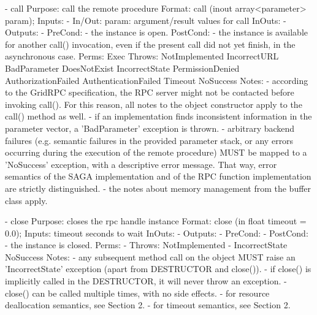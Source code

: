 \begin{myspec}
 
    - call
      Purpose:  call the remote procedure
      Format:   call         (inout array<parameter> param);
      Inputs:   - 
      In/Out:   param:        argument/result values for call
      InOuts:   -
      Outputs:  - 
      PreCond:  - the instance is open.
      PostCond: - the instance is available for another call()
                  invocation, even if the present call did not
                  yet finish, in the asynchronous case.
      Perms:    Exec
      Throws:   NotImplemented
                IncorrectURL
                BadParameter
                DoesNotExist
                IncorrectState
                PermissionDenied
                AuthorizationFailed
                AuthenticationFailed
                Timeout
                NoSuccess
      Notes:    - according to the GridRPC specification, the 
                  RPC server might not be contacted before
                  invoking call(). For this reason, all notes to
                  the object constructor apply to the call()
                  method as well.
                - if an implementation finds inconsistent
                  information in the parameter vector, a 
                  'BadParameter' exception is thrown.
                - arbitrary backend failures (e.g. semantic
                  failures in the provided parameter stack, or
                  any errors occurring during the execution of
                  the remote procedure) MUST be mapped to a
                  'NoSuccess' exception, with a descriptive
                  error message.  That way, error semantics of
                  the SAGA implementation and of the RPC
                  function implementation are strictly
                  distinguished.
                - the notes about memory management from the
                  buffer class apply.
 
 
    - close
      Purpose:  closes the rpc handle instance
      Format:   close              (in  float timeout = 0.0);
      Inputs:   timeout             seconds to wait
      InOuts:   -
      Outputs:  -
      PreCond:  -
      PostCond: - the instance is closed.
      Perms:    -
      Throws:   NotImplemented
-               IncorrectState
                NoSuccess
      Notes:    - any subsequent method call on the object
                  MUST raise an 'IncorrectState' exception
                  (apart from DESTRUCTOR and close()).
                - if close() is implicitly called in the
                  DESTRUCTOR, it will never throw an exception.
                - close() can be called multiple times, with no
                  side effects.
                - for resource deallocation semantics, see 
                  Section 2.
                - for timeout semantics, see Section 2.
 \end{myspec}
 
